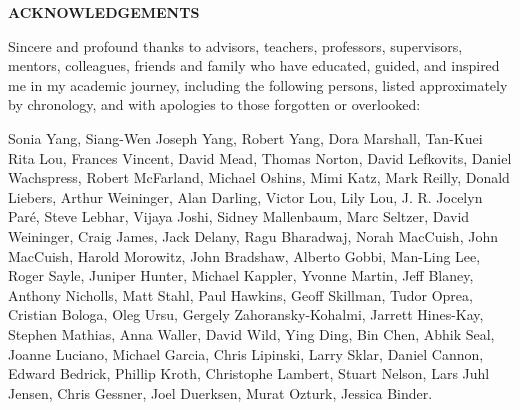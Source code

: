 \begin{centering}
\textbf{ACKNOWLEDGEMENTS}\\
\vspace{\baselineskip}
\end{centering}

Sincere and profound thanks to advisors, teachers, professors, supervisors, mentors, colleagues, friends and family who have educated, guided, and inspired me in my academic journey, including the following persons, listed approximately by chronology, and with apologies to those forgotten or overlooked:

Sonia Yang, Siang-Wen Joseph Yang, Robert Yang, Dora Marshall, Tan-Kuei Rita Lou, Frances Vincent, David Mead, Thomas Norton, David Lefkovits, Daniel Wachspress, Robert McFarland, Michael Oshins, Mimi Katz, Mark Reilly, Donald Liebers, Arthur Weininger, Alan Darling, Victor Lou, Lily Lou, J. R. Jocelyn Par\'e, Steve Lebhar, Vijaya Joshi, Sidney Mallenbaum, Marc Seltzer, David Weininger, Craig James, Jack Delany, Ragu Bharadwaj, Norah MacCuish, John MacCuish, Harold Morowitz, John Bradshaw, Alberto Gobbi, Man-Ling Lee, Roger Sayle, Juniper Hunter, Michael Kappler, Yvonne Martin, Jeff Blaney, Anthony Nicholls, Matt Stahl, Paul Hawkins, Geoff Skillman, Tudor Oprea, Cristian Bologa, Oleg Ursu, Gergely Zahoransky-Kohalmi, Jarrett Hines-Kay, Stephen Mathias, Anna Waller, David Wild, Ying Ding, Bin Chen, Abhik Seal, Joanne Luciano, Michael Garcia, Chris Lipinski, Larry Sklar, Daniel Cannon, Edward Bedrick, Phillip Kroth, Christophe Lambert, Stuart Nelson, Lars Juhl Jensen, Chris Gessner, Joel Duerksen, Murat Ozturk, Jessica Binder.
